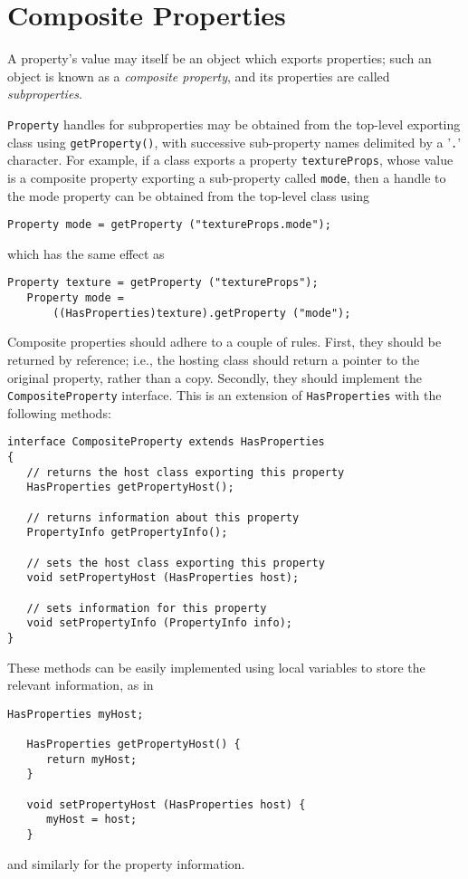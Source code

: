 \label{compositeSec}
\section{Composite Properties }

A property's value may itself be an object which exports properties;
such an object is known as a {\it composite property}, and
its properties are called {\it subproperties}.

{\tt Property} handles for subproperties may be obtained from the
top-level exporting class using {\tt getProperty()}, with successive
sub-property names delimited by a '{\tt .}' character.  For example,
if a class exports a property {\tt textureProps}, whose value is a
composite property exporting a sub-property called {\tt mode}, then a
handle to the mode property can be obtained from the top-level class
using
\begin{lstlisting}[]
   Property mode = getProperty ("textureProps.mode");    
\end{lstlisting}
which has the same effect as
\begin{lstlisting}[]
   Property texture = getProperty ("textureProps");    
   Property mode = 
       ((HasProperties)texture).getProperty ("mode");
\end{lstlisting}

Composite properties should adhere to a couple of rules.  First, they
should be returned by reference; i.e., the hosting class should return
a pointer to the original property, rather than a copy.
Secondly, they should implement the {\tt CompositeProperty}
interface.  This is an extension of {\tt HasProperties} with the
following methods:
\begin{lstlisting}[]
interface CompositeProperty extends HasProperties
{   
   // returns the host class exporting this property
   HasProperties getPropertyHost();

   // returns information about this property
   PropertyInfo getPropertyInfo();

   // sets the host class exporting this property
   void setPropertyHost (HasProperties host);

   // sets information for this property
   void setPropertyInfo (PropertyInfo info);
}
\end{lstlisting}
These methods can be easily implemented using local variables to store
the relevant information, as in
\begin{lstlisting}[]
   HasProperties myHost;

   HasProperties getPropertyHost() {
      return myHost;
   }

   void setPropertyHost (HasProperties host) {
      myHost = host;
   }
\end{lstlisting}
and similarly for the property information.

